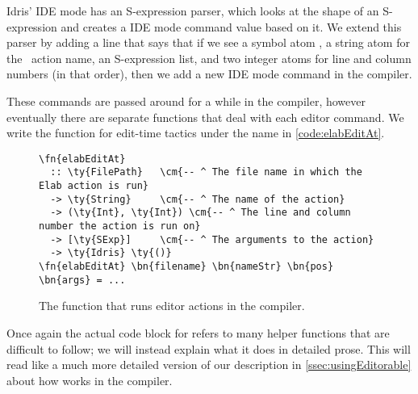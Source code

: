 Idris' IDE mode has an S-expression parser, which looks at the shape of an
S-expression and creates a IDE mode command value based on it. We extend this
parser by adding a line that says that if we see a symbol atom ,
a string atom for the \Elab\ action name, an S-expression list, and two integer
atoms for line and column numbers (in that order), then we add a new IDE mode
command in the compiler.

These commands are passed around for a while in the compiler, however
eventually there are separate functions that deal with each editor command. We
write the function for edit-time tactics under the name  in
\autoref{code:elabEditAt}.

\begin{figure}[H]
\caption{The function  that runs editor actions in the compiler.}
\label{code:elabEditAt}
\begin{Verbatim}[framesep=2mm, label=\footnotesize{\normalfont{Haskell}}, labelposition=topline]
\fn{elabEditAt}
  :: \ty{FilePath}   \cm{-- ^ The file name in which the Elab action is run}
  -> \ty{String}     \cm{-- ^ The name of the action}
  -> (\ty{Int}, \ty{Int}) \cm{-- ^ The line and column number the action is run on}
  -> [\ty{SExp}]     \cm{-- ^ The arguments to the action}
  -> \ty{Idris} \ty{()}
\fn{elabEditAt} \bn{filename} \bn{nameStr} \bn{pos} \bn{args} = ...
\end{Verbatim}
\end{figure}

Once again the actual code block for  refers to many helper
functions that are difficult to follow; we will instead explain what it does in
detailed prose. This will read like a much more detailed version of our
description in \autoref{ssec:usingEditorable} about how  works
in the compiler.

